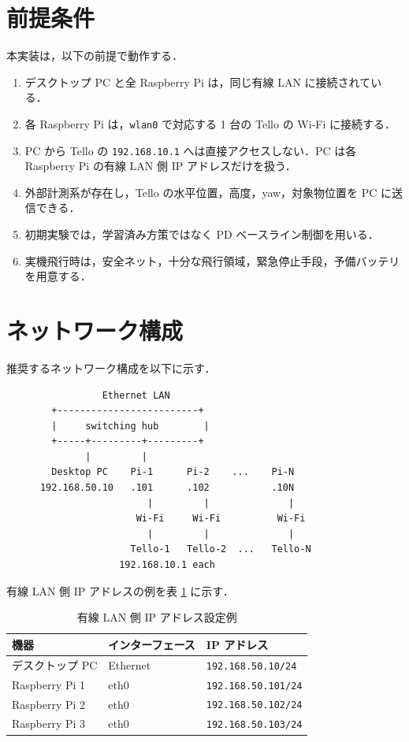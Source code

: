 \section{前提条件}
\label{sec:assumptions}

本実装は，以下の前提で動作する．

\begin{enumerate}[label=\arabic*.]
  \item デスクトップ PC と全 Raspberry Pi は，同じ有線 LAN に接続されている．
  \item 各 Raspberry Pi は，\texttt{wlan0} で対応する 1 台の Tello の Wi-Fi に接続する．
  \item PC から Tello の \texttt{192.168.10.1} へは直接アクセスしない．PC は各 Raspberry Pi の有線 LAN 側 IP アドレスだけを扱う．
  \item 外部計測系が存在し，Tello の水平位置，高度，yaw，対象物位置を PC に送信できる．
  \item 初期実験では，学習済み方策ではなく PD ベースライン制御を用いる．
  \item 実機飛行時は，安全ネット，十分な飛行領域，緊急停止手段，予備バッテリを用意する．
\end{enumerate}

\section{ネットワーク構成}
\label{sec:network}

推奨するネットワーク構成を以下に示す．

\begin{lstlisting}
                 Ethernet LAN
        +-------------------------+
        |     switching hub        |
        +-----+---------+---------+
              |         |         
        Desktop PC    Pi-1      Pi-2    ...    Pi-N
      192.168.50.10   .101      .102           .10N
                         |         |              |
                       Wi-Fi     Wi-Fi          Wi-Fi
                         |         |              |
                      Tello-1   Tello-2  ...   Tello-N
                    192.168.10.1 each
\end{lstlisting}

有線 LAN 側 IP アドレスの例を表 \ref{tab:ip_example} に示す．

\begin{table}[h]
  \centering
  \caption{有線 LAN 側 IP アドレス設定例}
  \label{tab:ip_example}
  \begin{tabular}{lll}
    \toprule
    機器 & インターフェース & IP アドレス \\
    \midrule
    デスクトップ PC & Ethernet & \texttt{192.168.50.10/24} \\
    Raspberry Pi 1 & eth0 & \texttt{192.168.50.101/24} \\
    Raspberry Pi 2 & eth0 & \texttt{192.168.50.102/24} \\
    Raspberry Pi 3 & eth0 & \texttt{192.168.50.103/24} \\
    \bottomrule
  \end{tabular}
\end{table}

